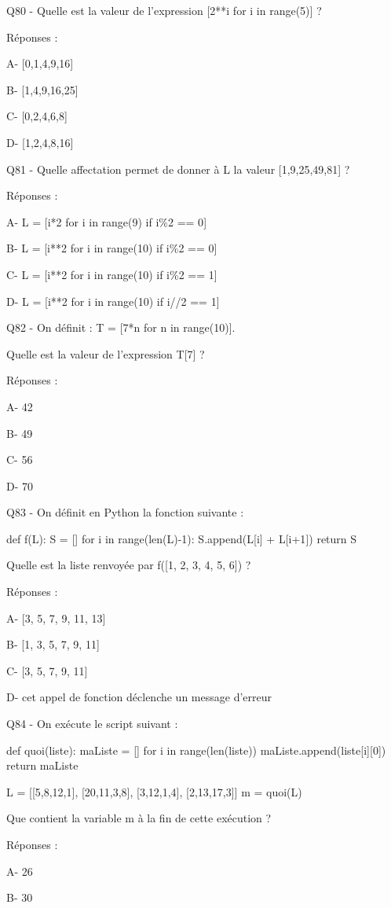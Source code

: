 \documentclass[
]{book}
\begin{document}
Q80 - Quelle est la valeur de l'expression {[}2**i for i in range(5){]} ?

Réponses :

A- {[}0,1,4,9,16{]}

B- {[}1,4,9,16,25{]}

C- {[}0,2,4,6,8{]}

D- {[}1,2,4,8,16{]}

Q81 - Quelle affectation permet de donner à L la valeur {[}1,9,25,49,81{]} ?

Réponses :

A- L = {[}i*2 for i in range(9) if i\%2 == 0{]}

B- L = {[}i**2 for i in range(10) if i\%2 == 0{]}

C- L = {[}i**2 for i in range(10) if i\%2 == 1{]}

D- L = {[}i**2 for i in range(10) if i//2 == 1{]}

Q82 - On définit : T = {[}7*n for n in range(10){]}.

Quelle est la valeur de l'expression T{[}7{]} ?

Réponses :

A- 42

B- 49

C- 56

D- 70

Q83 - On définit en Python la fonction suivante :

def f(L):
S = {[}{]}
for i in range(len(L)-1):
S.append(L{[}i{]} + L{[}i+1{]})
return S

Quelle est la liste renvoyée par f({[}1, 2, 3, 4, 5, 6{]}) ?

Réponses :

A- {[}3, 5, 7, 9, 11, 13{]}

B- {[}1, 3, 5, 7, 9, 11{]}

C- {[}3, 5, 7, 9, 11{]}

D- cet appel de fonction déclenche un message d'erreur

Q84 - On exécute le script suivant :

def quoi(liste):
maListe = {[}{]}
for i in range(len(liste))
maListe.append(liste{[}i{]}{[}0{]})
return maListe

L = {[}{[}5,8,12,1{]}, {[}20,11,3,8{]}, {[}3,12,1,4{]}, {[}2,13,17,3{]}{]}
m = quoi(L)

Que contient la variable m à la fin de cette exécution ?

Réponses :

A- 26

B- 30
\end{document}
